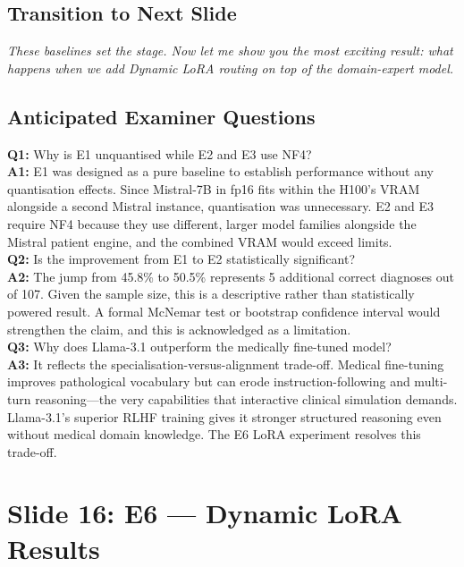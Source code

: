 \subsection*{Transition to Next Slide}
{\color{transgreen}
\textit{These baselines set the stage. Now let me show you the most exciting result: what happens when we add Dynamic LoRA routing on top of the domain-expert model.}
}

\subsection*{Anticipated Examiner Questions}
\begin{qabox}
\textbf{Q1:} Why is E1 unquantised while E2 and E3 use NF4? \\
\textbf{A1:} E1 was designed as a pure baseline to establish performance without any quantisation effects. Since Mistral-7B in fp16 fits within the H100's VRAM alongside a second Mistral instance, quantisation was unnecessary. E2 and E3 require NF4 because they use different, larger model families alongside the Mistral patient engine, and the combined VRAM would exceed limits. \\[6pt]
\textbf{Q2:} Is the improvement from E1 to E2 statistically significant? \\
\textbf{A2:} The jump from 45.8\% to 50.5\% represents 5 additional correct diagnoses out of 107. Given the sample size, this is a descriptive rather than statistically powered result. A formal McNemar test or bootstrap confidence interval would strengthen the claim, and this is acknowledged as a limitation. \\[6pt]
\textbf{Q3:} Why does Llama-3.1 outperform the medically fine-tuned model? \\
\textbf{A3:} It reflects the specialisation-versus-alignment trade-off. Medical fine-tuning improves pathological vocabulary but can erode instruction-following and multi-turn reasoning---the very capabilities that interactive clinical simulation demands. Llama-3.1's superior RLHF training gives it stronger structured reasoning even without medical domain knowledge. The E6 LoRA experiment resolves this trade-off.
\end{qabox}



\section{Slide 16: E6 --- Dynamic LoRA Results}

